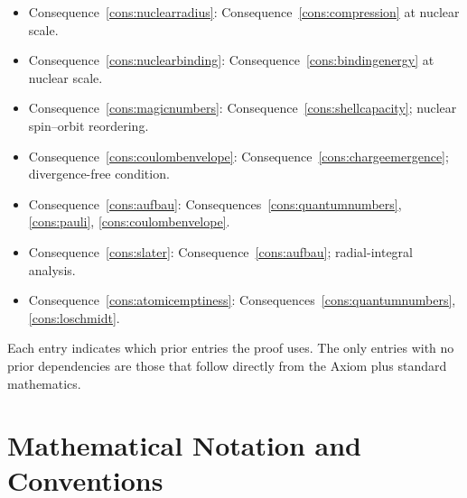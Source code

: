 \documentclass[11pt,twocolumn,a4paper]{article}
\theoremstyle{axiomstyle}
\theoremstyle{conseqstyle}
\theoremstyle{definition}
\theoremstyle{remark}
\begin{document}
\begin{itemize}
\item Consequence~\ref{cons:nuclearradius}: Consequence~\ref{cons:compression} at nuclear scale.
\item Consequence~\ref{cons:nuclearbinding}: Consequence~\ref{cons:bindingenergy} at nuclear scale.
\item Consequence~\ref{cons:magicnumbers}: Consequence~\ref{cons:shellcapacity}; nuclear spin--orbit reordering.
\item Consequence~\ref{cons:coulombenvelope}: Consequence~\ref{cons:chargeemergence}; divergence-free condition.
\item Consequence~\ref{cons:aufbau}: Consequences~\ref{cons:quantumnumbers}, \ref{cons:pauli}, \ref{cons:coulombenvelope}.
\item Consequence~\ref{cons:slater}: Consequence~\ref{cons:aufbau}; radial-integral analysis.
\item Consequence~\ref{cons:atomicemptiness}: Consequences~\ref{cons:quantumnumbers}, \ref{cons:loschmidt}.
\end{itemize}

Each entry indicates which prior entries the proof uses. The only entries with no prior dependencies are those that follow directly from the Axiom plus standard mathematics.

\section{Mathematical Notation and Conventions}
\label{app:notation}
\end{document}
